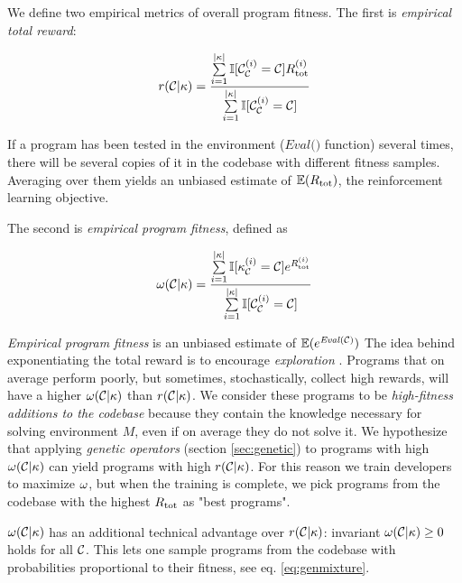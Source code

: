 We define two empirical metrics of overall program fitness.
The first is \emph{empirical total reward}:

\begin{equation}
    r(\mathcal{C}|\kappa) = \frac{\sum\limits_{i=1}^{|\kappa|} \mathbb{I}[\mathcal{C}_{\mathcal{C}}^{(i)}=\mathcal{C}] R_\text{tot}^{(i)}}{\sum\limits_{i=1}^{|\kappa|} \mathbb{I}[\mathcal{C}_{\mathcal{C}}^{(i)}=\mathcal{C}]}
\end{equation}

If a program has been tested in the environment ($\textit{Eval()}$ function) several times, there will be several copies of it in the codebase with different fitness samples.
Averaging over them yields an unbiased estimate of $\mathbb{E}(R_\text{tot})$, the reinforcement learning objective.

The second is \emph{empirical program fitness}, defined as

\begin{equation}
    \omega(\mathcal{C}|\kappa) = \frac{\sum\limits_{i=1}^{|\kappa|} \mathbb{I}[\kappa_{\mathcal{C}}^{(i)}=\mathcal{C}] e^{R_\text{tot}^{(i)}}}{\sum\limits_{i=1}^{|\kappa|} \mathbb{I}[\mathcal{C}_{\mathcal{C}}^{(i)}=\mathcal{C}]}
    \label{eq:empfitness}
\end{equation}

\emph{Empirical program fitness} is an unbiased estimate of $\mathbb{E}(e^{\mathit{Eval}(\mathcal{C})})$
The idea behind exponentiating the total reward is to encourage \emph{exploration} \cite{exploration}.
Programs that on average perform poorly, but sometimes, stochastically, collect high rewards, will have a higher $\omega(\mathcal{C}|\kappa)$ than $r(\mathcal{C}|\kappa)$.
We consider these programs to be \emph{high-fitness additions to the codebase} because they contain the knowledge necessary for solving environment $M$, even if on average they do not solve it.
We hypothesize that applying \emph{genetic operators} (section \ref{sec:genetic}) to programs with high $\omega(\mathcal{C}|\kappa)$ can yield programs with high $r(\mathcal{C}|\kappa)$.
For this reason we train developers to maximize $\omega$, but when the training is complete, we pick programs from the codebase with the highest $R_\text{tot}$ as "best programs".
 
$\omega(\mathcal{C}|\kappa)$ has an additional technical advantage over $r(\mathcal{C}|\kappa)$: invariant $\omega(\mathcal{C}|\kappa) \geq 0$ holds for all $\mathcal{C}$.
This lets one sample programs from the codebase with probabilities proportional to their fitness, see eq. \ref{eq:genmixture}.

